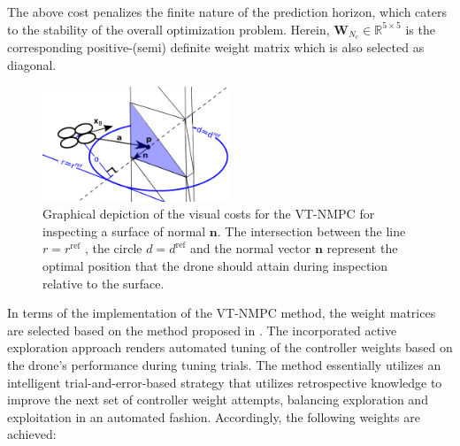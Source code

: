 \documentclass[letterpaper, 10 pt, conference]{ieeeconf}  %
\begin{document}
%
The above cost penalizes the finite nature of the prediction horizon, which caters to the stability of the overall optimization problem. Herein, $ \mathbf{W}_{N_c} \in \mathbb{R}^ {5 \times 5} $ is the corresponding positive-(semi) definite weight matrix which is also selected as diagonal. 
\begin{figure}
    \centering
    \includegraphics[width=0.5\textwidth]{Autonomous_Robots/figures/vtmpc_overview_1.pdf}
    \caption{Graphical depiction of the visual costs for the VT-NMPC for inspecting a surface of normal $\mathbf{n}$. The intersection between the line $r=r^\textrm{ref}$ , the circle $d=d^\textrm{ref}$ and the normal vector $\mathbf{n}$ represent the optimal position that the drone should attain during inspection relative to the surface. }
    \label{fig:methodoverview}  
\end{figure}
In terms of the implementation of the \ac{VT-NMPC} method, the weight matrices are selected based on the method proposed in \cite{deepmodel_mohit}. The incorporated active exploration approach renders automated tuning of the controller weights based on the drone’s performance during tuning trials. The method essentially utilizes an intelligent trial-and-error-based strategy that utilizes retrospective knowledge to improve the next set of controller weight attempts, balancing exploration and exploitation in an automated fashion. Accordingly, the following weights are achieved:
\end{document}

